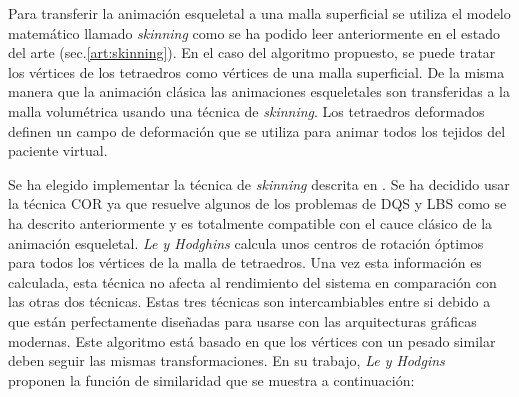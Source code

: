 Para transferir la animación esqueletal a una malla superficial se utiliza el modelo matemático llamado \emph{skinning} como se ha podido leer anteriormente en el estado del arte (sec.\ref{art:skinning}). En el caso del algoritmo propuesto, se puede tratar los vértices de los tetraedros como vértices de una malla superficial. De la misma manera que la animación clásica las animaciones esqueletales son transferidas a la malla volumétrica usando una técnica de \emph{skinning}. Los tetraedros deformados definen un campo de deformación que se utiliza para animar todos los tejidos del paciente virtual.


Se ha elegido implementar la técnica de \emph{skinning} descrita en \cite{le2016real}. Se ha decidido usar la técnica \ac{COR} ya que resuelve algunos de los problemas de \ac{DQS} y \ac{LBS} como se ha descrito anteriormente y es totalmente compatible con el cauce clásico de la animación esqueletal. \emph{Le y Hodghins} calcula unos centros de rotación óptimos para todos los vértices de la malla de tetraedros. Una vez esta información es calculada, esta técnica no afecta al rendimiento del sistema en comparación con las otras dos técnicas. Estas tres técnicas son intercambiables entre si debido a que están perfectamente diseñadas para usarse con las arquitecturas gráficas modernas. Este algoritmo está basado en que los vértices con un pesado similar deben seguir las mismas transformaciones. En su trabajo, \emph {Le y Hodgins} ~\cite{le2016real} proponen la función de similaridad que se muestra a continuación:

